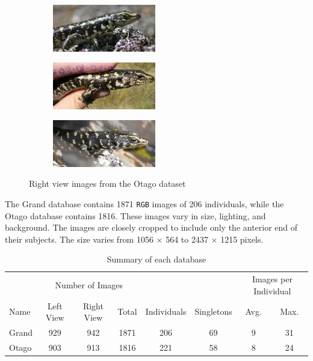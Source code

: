 \begin{figure}[htb]
  \centering
  \begin{subfigure}[t]{0.31\textwidth}
      \centering
      \includegraphics[width=4.5cm]{dataset/general/otago_R2}
  \end{subfigure}%
  \begin{subfigure}[t]{0.31\textwidth}
      \centering
      \includegraphics[width=4.5cm]{dataset/general/otago_R1}
  \end{subfigure}
  \begin{subfigure}[t]{0.31\textwidth}
      \centering
      \includegraphics[width=4.5cm]{dataset/general/otago_R3}
  \end{subfigure}
  \captionsetup{justification=centering}
  \caption{Right view images from the Otago dataset}
  \label{fig:otago_right} %
\end{figure}

The Grand database contains 1871 \texttt{RGB} images of 206 individuals, while
the Otago database contains 1816. These images vary in size, lighting, and
background. The images are closely cropped to include only the anterior end of
their subjects. The size varies from 1056 $\times$ 564 to 2437 $\times$ 1215
pixels.

\begin{table}[htb]
\captionsetup{justification=centering}
  \caption{Summary of each database}
  \label{tab:database_summary} %
  \centering
  \begin{tabular}{lccccccc}
    \toprule
    & \multicolumn{3}{c}{Number of Images} & & &
        \multicolumn{2}{c}{Images per Individual} \\
    \cmidrule{2-4}
    \cmidrule{7-8}
    Name & Left View & Right View & Total & Individuals & Singletons & Avg.
        & Max. \\
    \midrule
    Grand & 929 & 942 & 1871 & 206  & 69 & 9 & 31 \\
    Otago & 903 & 913 & 1816 & 221  & 58 & 8 & 24 \\
    \bottomrule
  \end{tabular}
\end{table}


